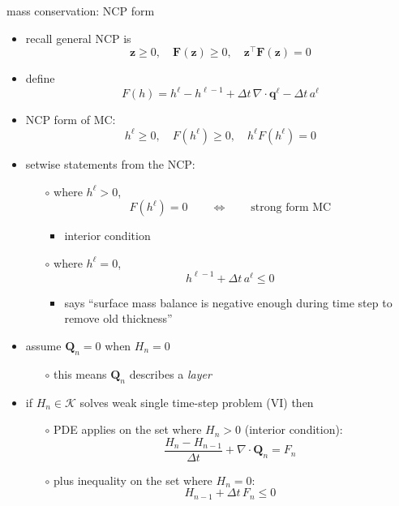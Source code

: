 \documentclass[xcolor={dvipsnames}]{beamer}
\newcommand\bq{\mathbf{q}}
\newcommand\bz{\mathbf{z}}
\newcommand\bF{\mathbf{F}}
\newcommand\bQ{\mathbf{Q}}
\newcommand\Div{\nabla\cdot}
\begin{document}
\begin{frame}{mass conservation: NCP form}

\begin{itemize}
\item recall general NCP is
  $$\bz \ge 0, \quad \bF(\bz) \ge 0, \quad \bz^\top \bF(\bz) = 0$$
\item define
    $$F(h) = h^\ell - h^{\ell-1} + \Delta t\, \Div \bq^\ell - \Delta t\, a^\ell$$
\item NCP form of MC:
   $$h^\ell \ge 0, \quad F(h^\ell) \ge 0, \quad h^\ell F(h^\ell) = 0$$
\item setwise statements from the NCP:
    \begin{itemize}
    \item[$\circ$] where $h^\ell > 0$,
        $$F(h^\ell) = 0 \qquad \iff \qquad \text{strong form MC}$$
        \vspace{-4mm}
        \begin{itemize}
        \item interior condition
        \end{itemize}
    \item[$\circ$] where $h^\ell = 0$,
        $$h^{\ell-1} + \Delta t\, a^\ell \le 0$$
        \vspace{-4mm}
        \begin{itemize}
        \item says ``surface mass balance is negative enough during time step to remove old thickness''
        \end{itemize}
    \end{itemize}
  \item assume $\bQ_n=0$ when $H_n=0$
    \begin{itemize}
    \item[$\circ$] this means $\bQ_n$ describes a \emph{layer}
    \end{itemize}
  \item if $H_n \in \mathcal{K}$ solves weak single time-step problem (VI) then
      \medskip
	  \begin{itemize}
	  \item[$\circ$] PDE applies on the set where $H_n>0$ (interior condition):
	    $$\frac{H_n - H_{n-1}}{\Delta t} + \Div \bQ_n = F_n$$
	  \item[$\circ$] plus inequality on the set where $H_n = 0$:
	    $$H_{n-1} + \Delta t\, F_n \le 0$$
	  \end{itemize}
\end{itemize}
\end{frame}
\end{document}
